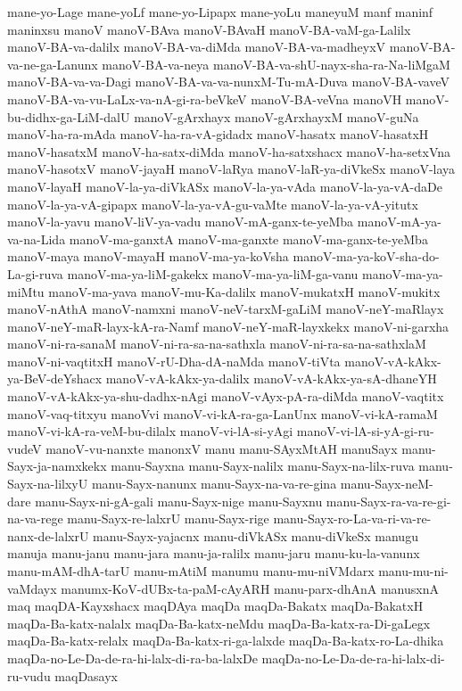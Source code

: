 {mane-yo-Lage
mane-yoLf
mane-yo-Lipapx
mane-yoLu
maneyuM
manf
maninf
maninxsu
manoV
manoV-BAva
manoV-BAvaH
manoV-BA-vaM-ga-Lalilx
manoV-BA-va-dalilx
manoV-BA-va-diMda
manoV-BA-va-madheyxV
manoV-BA-va-ne-ga-Lanunx
manoV-BA-va-neya
manoV-BA-va-shU-nayx-sha-ra-Na-liMgaM
manoV-BA-va-va-Dagi
manoV-BA-va-va-nunxM-Tu-mA-Duva
manoV-BA-vaveV
manoV-BA-va-vu-LaLx-va-nA-gi-ra-beVkeV
manoV-BA-veVna
manoVH
manoV-bu-didhx-ga-LiM-dalU
manoV-gArxhayx
manoV-gArxhayxM
manoV-guNa
manoV-ha-ra-mAda
manoV-ha-ra-vA-gidadx
manoV-hasatx
manoV-hasatxH
manoV-hasatxM
manoV-ha-satx-diMda
manoV-ha-satxshacx
manoV-ha-setxVna
manoV-hasotxV
manoV-jayaH
manoV-laRya
manoV-laR-ya-diVkeSx
manoV-laya
manoV-layaH
manoV-la-ya-diVkASx
manoV-la-ya-vAda
manoV-la-ya-vA-daDe
manoV-la-ya-vA-gipapx
manoV-la-ya-vA-gu-vaMte
manoV-la-ya-vA-yitutx
manoV-la-yavu
manoV-liV-ya-vadu
manoV-mA-ganx-te-yeMba
manoV-mA-ya-va-na-Lida
manoV-ma-ganxtA
manoV-ma-ganxte
manoV-ma-ganx-te-yeMba
manoV-maya
manoV-mayaH
manoV-ma-ya-koVsha
manoV-ma-ya-koV-sha-do-La-gi-ruva
manoV-ma-ya-liM-gakekx
manoV-ma-ya-liM-ga-vanu
manoV-ma-ya-miMtu
manoV-ma-yava
manoV-mu-Ka-dalilx
manoV-mukatxH
manoV-mukitx
manoV-nAthA
manoV-namxni
manoV-neV-tarxM-gaLiM
manoV-neY-maRlayx
manoV-neY-maR-layx-kA-ra-Namf
manoV-neY-maR-layxkekx
manoV-ni-garxha
manoV-ni-ra-sanaM
manoV-ni-ra-sa-na-sathxla
manoV-ni-ra-sa-na-sathxlaM
manoV-ni-vaqtitxH
manoV-rU-Dha-dA-naMda
manoV-tiVta
manoV-vA-kAkx-ya-BeV-deYshacx
manoV-vA-kAkx-ya-dalilx
manoV-vA-kAkx-ya-sA-dhaneYH
manoV-vA-kAkx-ya-shu-dadhx-nAgi
manoV-vAyx-pA-ra-diMda
manoV-vaqtitx
manoV-vaq-titxyu
manoVvi
manoV-vi-kA-ra-ga-LanUnx
manoV-vi-kA-ramaM
manoV-vi-kA-ra-veM-bu-dilalx
manoV-vi-lA-si-yAgi
manoV-vi-lA-si-yA-gi-ru-vudeV
manoV-vu-nanxte
manonxV
manu
manu-SAyxMtAH
manuSayx
manu-Sayx-ja-namxkekx
manu-Sayxna
manu-Sayx-nalilx
manu-Sayx-na-lilx-ruva
manu-Sayx-na-lilxyU
manu-Sayx-nanunx
manu-Sayx-na-va-re-gina
manu-Sayx-neM-dare
manu-Sayx-ni-gA-gali
manu-Sayx-nige
manu-Sayxnu
manu-Sayx-ra-va-re-gi-na-va-rege
manu-Sayx-re-lalxrU
manu-Sayx-rige
manu-Sayx-ro-La-va-ri-va-re-nanx-de-lalxrU
manu-Sayx-yajacnx
manu-diVkASx
manu-diVkeSx
manugu
manuja
manu-janu
manu-jara
manu-ja-ralilx
manu-jaru
manu-ku-la-vanunx
manu-mAM-dhA-tarU
manu-mAtiM
manumu
manu-mu-niVMdarx
manu-mu-ni-vaMdayx
manumx-KoV-dUBx-ta-paM-cAyARH
manu-parx-dhAnA
manusxnA
maq
maqDA-Kayxshacx
maqDAya
maqDa
maqDa-Bakatx
maqDa-BakatxH
maqDa-Ba-katx-nalalx
maqDa-Ba-katx-neMdu
maqDa-Ba-katx-ra-Di-gaLegx
maqDa-Ba-katx-relalx
maqDa-Ba-katx-ri-ga-lalxde
maqDa-Ba-katx-ro-La-dhika
maqDa-no-Le-Da-de-ra-hi-lalx-di-ra-ba-lalxDe
maqDa-no-Le-Da-de-ra-hi-lalx-di-ru-vudu
maqDasayx
}
